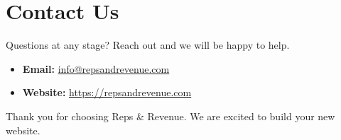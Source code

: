 \documentclass[11pt,a4paper]{article}
\begin{document}
\section{Contact Us}

Questions at any stage? Reach out and we will be happy to help.

\begin{itemize}[leftmargin=*]
    \item \textbf{Email:} \href{mailto:info@repsandrevenue.com}{info@repsandrevenue.com}
    \item \textbf{Website:} \url{https://repsandrevenue.com}
\end{itemize}

\vfill
\begin{center}
    \color{brand-muted}\small
    Thank you for choosing Reps \& Revenue. We are excited to build your new website.
\end{center}
\end{document}
